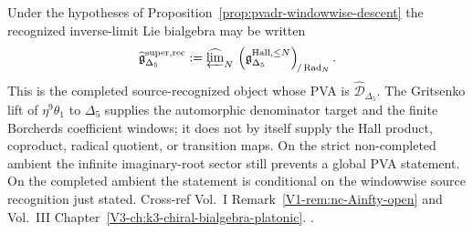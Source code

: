 \begin{remark}
\label{rem:pvadr-weight-completed}
Under the hypotheses of Proposition~\ref{prop:pvadr-windowwise-descent}
the recognized inverse-limit Lie bialgebra may be written
\[
 \widehat{\mathfrak g}^{\mathrm{super},\mathrm{rec}}_{\Delta_5}
 :=
 \widehat{\varprojlim}_{N}\,
 \left(
 \mathfrak g_{\Delta_5}^{\mathrm{Hall},\le N}
 \right)_{\!/\operatorname{Rad}_N}.
\]
This is the completed source-recognized object whose PVA is
$\widehat{\mathcal D}_{\Delta_5}$.  The Gritsenko lift of
$\eta^9\theta_1$ to $\Delta_5$ supplies the automorphic denominator
target and the finite Borcherds coefficient windows; it does not by
itself supply the Hall product, coproduct, radical quotient, or
transition maps.  On the strict non-completed ambient the infinite
imaginary-root sector still prevents a global PVA statement.  On the
completed ambient the statement is conditional on the windowwise
source recognition just stated.  Cross-ref Vol.~I
Remark~\ref{V1-rem:nc-Ainfty-open} and Vol.~III
Chapter~\ref{V3-ch:k3-chiral-bialgebra-platonic}.
\cite{GritsenkoNikulin1998,Gritsenko1999,Lusztig1990,KhanZeng2025}.
\end{remark}
